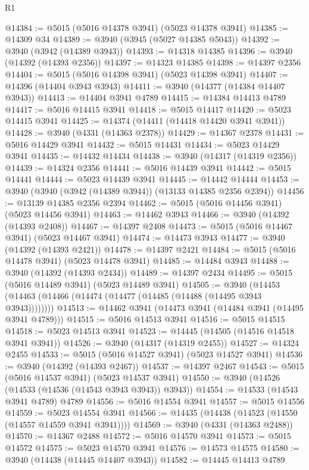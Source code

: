 \begin{lexlean}{R1}
\begin{coremodule}
@14384 := @5015 (@5016 @14378 @3941) (@5023 @14378 @3941)
@14385 := @14309 @34
@14389 := @3940 (@3945 (@5027 @14385 @5043))
@14392 := @3940 (@3942 (@14389 @3943))
@14393 := @14318 @14385
@14396 := @3940 (@14392 (@14393 @2356))
@14397 := @14323 @14385
@14398 := @14397 @2356
@14404 := @5015 (@5016 @14398 @3941) (@5023 @14398 @3941)
@14407 := @14396 (@14404 @3943 @3943)
@14411 := @3940 (@14377 (@14384 @14407 @3943))
@14413 := @14404 @3941 @4789
@14415 := @14384 @14413 @4789
@14417 := @5016 @14415 @3941
@14418 := @5015 @14417
@14420 := @5023 @14415 @3941
@14425 := @14374 (@14411 (@14418 @14420 @3941 @3941))
@14428 := @3940 (@4331 (@14363 @2378))
@14429 := @14367 @2378
@14431 := @5016 @14429 @3941
@14432 := @5015 @14431
@14434 := @5023 @14429 @3941
@14435 := @14432 @14434
@14438 := @3940 (@14317 (@14319 @2356))
@14439 := @14324 @2356
@14441 := @5016 @14439 @3941
@14442 := @5015 @14441
@14444 := @5023 @14439 @3941
@14445 := @14442 @14444
@14453 := @3940 (@3940 (@3942 (@14389 @3944)) (@13133 @14385 @2356 @2394))
@14456 := @13139 @14385 @2356 @2394
@14462 := @5015 (@5016 @14456 @3941) (@5023 @14456 @3941)
@14463 := @14462 @3943
@14466 := @3940 (@14392 (@14393 @2408))
@14467 := @14397 @2408
@14473 := @5015 (@5016 @14467 @3941) (@5023 @14467 @3941)
@14474 := @14473 @3943
@14477 := @3940 (@14392 (@14393 @2421))
@14478 := @14397 @2421
@14484 := @5015 (@5016 @14478 @3941) (@5023 @14478 @3941)
@14485 := @14484 @3943
@14488 := @3940 (@14392 (@14393 @2434))
@14489 := @14397 @2434
@14495 := @5015 (@5016 @14489 @3941) (@5023 @14489 @3941)
@14505 := @3940 (@14453 (@14463 (@14466 (@14474 (@14477 (@14485 (@14488 (@14495 @3943 @3943))))))))
@14513 := @14462 @3941 (@14473 @3941 (@14484 @3941 (@14495 @3941 @4789)))
@14515 := @5016 @14513 @3941
@14516 := @5015 @14515
@14518 := @5023 @14513 @3941
@14523 := @14445 (@14505 (@14516 @14518 @3941 @3941))
@14526 := @3940 (@14317 (@14319 @2455))
@14527 := @14324 @2455
@14533 := @5015 (@5016 @14527 @3941) (@5023 @14527 @3941)
@14536 := @3940 (@14392 (@14393 @2467))
@14537 := @14397 @2467
@14543 := @5015 (@5016 @14537 @3941) (@5023 @14537 @3941)
@14550 := @3940 (@14526 (@14533 (@14536 (@14543 @3943 @3943)) @3943))
@14554 := @14533 (@14543 @3941 @4789) @4789
@14556 := @5016 @14554 @3941
@14557 := @5015 @14556
@14559 := @5023 @14554 @3941
@14566 := @14435 (@14438 (@14523 (@14550 (@14557 @14559 @3941 @3941))))
@14569 := @3940 (@4331 (@14363 @2488))
@14570 := @14367 @2488
@14572 := @5016 @14570 @3941
@14573 := @5015 @14572
@14575 := @5023 @14570 @3941
@14576 := @14573 @14575
@14580 := @3940 (@14438 (@14445 @14407 @3943))
@14582 := @14445 @14413 @4789

\end{coremodule}
\end{lexlean}
